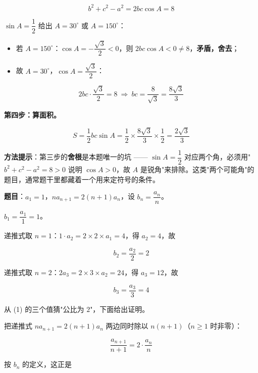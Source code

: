 \[b^{2}+c^{2}-a^{2}=2bc\cos A=8\]

$\sin A=\dfrac12$ 给出 $A=30^\circ$ 或 $A=150^\circ$：

\begin{itemize}
\item 若 $A=150^\circ$：$\cos A=-\dfrac{\sqrt3}2<0$，则 $2bc\cos A<0\ne8$，\textbf{矛盾，舍去}；
\item 故 $A=30^\circ$，$\cos A=\dfrac{\sqrt3}2$：
\end{itemize}
\[2bc\cdot\frac{\sqrt3}2=8\ \Longrightarrow\ bc=\frac8{\sqrt3}=\frac{8\sqrt3}3\]

\textbf{第四步：算面积。}

\[S=\frac12bc\sin A=\frac12\times\frac{8\sqrt3}3\times\frac12=\frac{2\sqrt3}3\]


\begin{gktip}
\textbf{方法提示}：第三步的\textbf{舍根}是本题唯一的坑 —— $\sin A=\dfrac12$ 对应两个角，必须用"$b^{2}+c^{2}-a^{2}=8>0$ 说明 $\cos A>0$，故 $A$ 是锐角"来排除。这类"两个可能角"的题目，通常题干里都藏着一个用来定符号的条件。
\end{gktip}

\par\medskip



\textbf{题目}：$a_1=1$，$na_{n+1}=2(n+1)a_n$，设 $b_n=\dfrac{a_n}n$。


$b_1=\dfrac{a_1}1=1$。

递推式取 $n=1$：$1\cdot a_2=2\times2\times a_1=4$，得 $a_2=4$，故

\[b_2=\frac{a_2}2=2\]

递推式取 $n=2$：$2a_3=2\times3\times a_2=24$，得 $a_3=12$，故

\[b_3=\frac{a_3}3=4\]



从 (1) 的三个值猜"公比为 $2$"，下面给出证明。

把递推式 $na_{n+1}=2(n+1)a_n$ 两边同时除以 $n(n+1)$（$n\ge1$ 时非零）：

\[\frac{a_{n+1}}{n+1}=2\cdot\frac{a_n}n\]

按 $b_n$ 的定义，这正是

